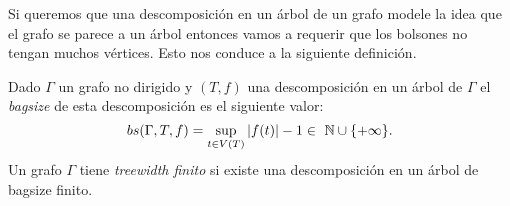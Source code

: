 \documentclass[tesis.tex]{subfiles}
\begin{document}
Si queremos que una descomposición en un árbol de un grafo modele la idea que el grafo se parece a un árbol entonces vamos a requerir que los 
bolsones no tengan muchos vértices. 
Esto nos conduce a la siguiente definición.



\begin{deff}
	Dado $\Gamma$ un grafo no dirigido y $(T,f)$ una descomposición en un árbol de $\Gamma$ el \emph{bagsize} de esta descomposición es el siguiente valor:
	\begin{equation*}
		bs(\Gamma,T,f) = \sup_{t \in V(T)} |f(t)| - 1 \in \  \mathbb{N} \cup \{ +\infty \}.
	\end{equation*}
	Un grafo $\Gamma$ tiene \emph{treewidth finito} si existe una descomposición en un árbol de bagsize finito.	
\end{deff}
\end{document}
